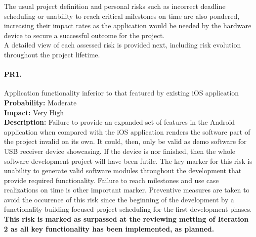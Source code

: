 		The usual project definition and personal risks such as incorrect deadline scheduling or unability to reach critical milestones on time are also pondered, increasing their impact rates as the application would be needed by the hardware device to secure a successful outcome for the project.\\
		
		A detailed view of each assessed risk is provided next, including risk evolution throughout the project lifetime.\\

		\paragraph{PR1.}Application functionality inferior to that featured by existing iOS application\\
		\textbf{Probability:} Moderate\\
		\textbf{Impact:} Very High\\
		\textbf{Description:} Failure to provide an expanded set of features in the Android application when compared with the iOS application renders the software part of the project invalid on its own. It could, then, only be valid as demo software for USB receiver device showcasing. If the device is nor finished, then the whole software development project will have been futile.
		The key marker for this risk is unability to generate valid software modules throughout the development that provide required functionality. Failure to reach milestones and use case realizations on time is other important marker.
		Preventive measures are taken to avoid the occurence of this risk since the beginning of the development by a functionality building focused project scheduling for the first development phases.\\
		\textbf{This risk is marked as surpassed at the reviewing metting of Iteration 2 as all key functionality has been implemented, as planned.}

